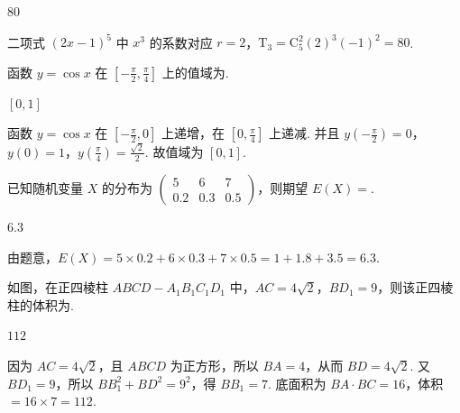 \documentclass[UTF8,a4paper,oneside,11pt]{ctexbook}
\begin{document}
\begin{answer}
\(80\)
\end{answer}

\begin{solution}
二项式 \((2x-1)^5\) 中 \(x^3\) 的系数对应 \(r=2\)，\(\mathrm{T}_{3}=\mathrm C_5^2(2)^3(-1)^2=80\).
\end{solution}

\begin{problem}
函数 \(y=\cos x\) 在 \([-\frac{\pi}{2},\frac{\pi}{4}]\) 上的值域为\fillinblank{}.
\end{problem}

\begin{answer}
\([0,1]\)
\end{answer}

\begin{solution}
函数 \(y=\cos x\) 在 \([-\frac{\pi}{2},0]\) 上递增，在 \([0,\frac{\pi}{4}]\) 上递减. 并且 \(y(-\frac{\pi}{2})=0\)，\(y(0)=1\)，\(y(\frac{\pi}{4})=\frac{\sqrt2}{2}\). 故值域为 \([0,1]\).
\end{solution}

\begin{problem}
已知随机变量 \(X\) 的分布为
\(\begin{pmatrix}5&6&7\\0.2&0.3&0.5\end{pmatrix}\)，则期望 \(E(X)=\)\fillinblank{}.
\end{problem}

\begin{answer}
\(6.3\)
\end{answer}

\begin{solution}
由题意，\(E(X)=5\times0.2+6\times0.3+7\times0.5=1+1.8+3.5=6.3\).
\end{solution}

\begin{problem}
如图，在正四棱柱 \(ABCD-A_1B_1C_1D_1\) 中，\(AC=4\sqrt2\)，\(BD_1=9\)，则该正四棱柱的体积为\fillinblank{}.

\end{problem}

\begin{answer}
\(112\)
\end{answer}

\begin{solution}
因为 \(AC=4\sqrt2\)，且 \(ABCD\) 为正方形，所以 \(BA=4\)，从而 \(BD=4\sqrt2\). 又 \(BD_1=9\)，所以 \(BB_1^2+BD^2=9^2\)，得 \(BB_1=7\). 底面积为 \(BA\cdot BC=16\)，体积 \(=16\times7=112\).
\end{solution}
\end{document}
